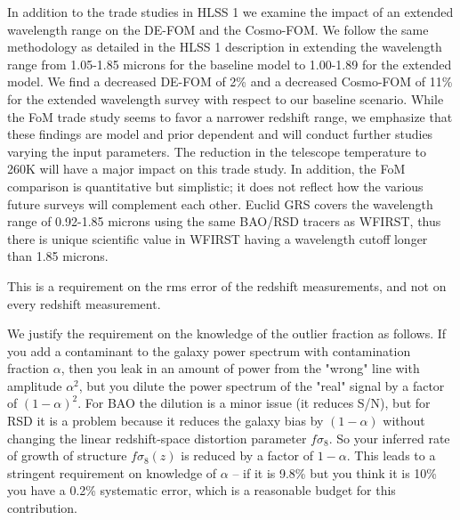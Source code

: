  In addition to the trade studies in HLSS 1 we examine the impact of an extended
 wavelength range on the DE-FOM and the Cosmo-FOM. We follow the same methodology
 as detailed in the HLSS 1 description in extending the wavelength range from
 1.05-1.85 microns for the baseline model to 1.00-1.89 for the extended model.
 We find a decreased DE-FOM of 2\% and a decreased
 Cosmo-FOM of 11\% for the extended wavelength survey with respect to our
 baseline scenario. While the FoM trade study seems to favor a narrower redshift
 range, we emphasize that these findings are model and prior dependent and will
 conduct further studies varying the input parameters. The reduction in the
 telescope temperature to 260K will have a major impact on this trade study. In
 addition, the FoM comparison is quantitative but simplistic; it does not reflect
 how the various future surveys will complement each other. Euclid GRS covers the
 wavelength range of 0.92-1.85 microns using the same BAO/RSD tracers as WFIRST,
 thus there is unique scientific value in WFIRST having a wavelength cutoff
 longer than 1.85 microns.


 This is a requirement on the rms error of the redshift measurements, and not on
 every redshift measurement.

 We justify the requirement on the knowledge of the outlier fraction as follows.
 If you add a contaminant to the galaxy power spectrum with contamination
 fraction $\alpha$, then you leak in an amount of power from the "wrong" line
 with amplitude $\alpha^2$, but you dilute the power spectrum of the "real"
 signal by a factor of $(1-\alpha)^2$. For BAO the dilution is a minor issue (it
 reduces S/N), but for RSD it is a problem because it reduces the galaxy bias by
 $(1-\alpha)$ without changing the linear redshift-space distortion parameter
 $f\sigma_8$. So your inferred rate of growth of structure $f\sigma_8(z)$ is
 reduced by a factor of $1-\alpha$.  This leads to a stringent requirement on
 knowledge of $\alpha$ -- if it is 9.8\% but you think it is 10\% you have a
 0.2\% systematic error, which is a reasonable budget for this contribution.

